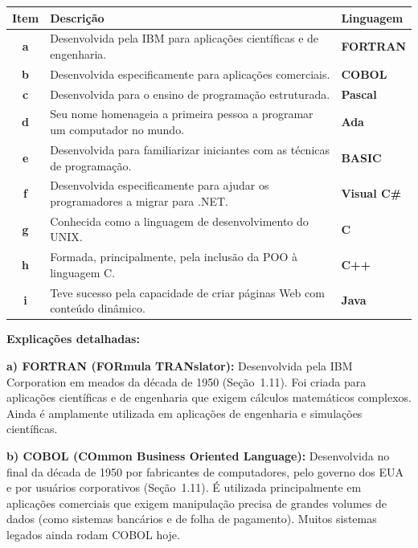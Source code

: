 \documentclass[12pt,a4paper]{article}
\begin{document}
\begin{respostabox}

\begin{center}
\renewcommand{\arraystretch}{1.6}
\begin{tabular}{>{\bfseries}c p{7.5cm} l}
  \toprule
  \textbf{Item} & \textbf{Descrição} & \textbf{Linguagem} \\
  \midrule
  a & Desenvolvida pela IBM para aplicações científicas e de engenharia. &
    \textcolor{deitelblue}{\bfseries FORTRAN} \\
  b & Desenvolvida especificamente para aplicações comerciais. &
    \textcolor{deitelblue}{\bfseries COBOL} \\
  c & Desenvolvida para o ensino de programação estruturada. &
    \textcolor{deitelblue}{\bfseries Pascal} \\
  d & Seu nome homenageia a primeira pessoa a programar um computador no mundo. &
    \textcolor{deitelblue}{\bfseries Ada} \\
  e & Desenvolvida para familiarizar iniciantes com as técnicas de programação. &
    \textcolor{deitelblue}{\bfseries BASIC} \\
  f & Desenvolvida especificamente para ajudar os programadores a migrar para .NET. &
    \textcolor{deitelblue}{\bfseries Visual C\#} \\
  g & Conhecida como a linguagem de desenvolvimento do UNIX. &
    \textcolor{deitelblue}{\bfseries C} \\
  h & Formada, principalmente, pela inclusão da POO à linguagem C. &
    \textcolor{deitelblue}{\bfseries C++} \\
  i & Teve sucesso pela capacidade de criar páginas Web com conteúdo dinâmico. &
    \textcolor{deitelblue}{\bfseries Java} \\
  \bottomrule
\end{tabular}
\end{center}

\bigskip
\textbf{Explicações detalhadas:}

\textbf{a) FORTRAN (FORmula TRANslator):}
Desenvolvida pela IBM Corporation em meados da década de 1950 (Seção~1.11). Foi
criada para aplicações científicas e de engenharia que exigem cálculos matemáticos
complexos. Ainda é amplamente utilizada em aplicações de engenharia e simulações
científicas.

\medskip
\textbf{b) COBOL (COmmon Business Oriented Language):}
Desenvolvida no final da década de 1950 por fabricantes de computadores, pelo
governo dos EUA e por usuários corporativos (Seção~1.11). É utilizada principalmente
em aplicações comerciais que exigem manipulação precisa de grandes volumes de dados
(como sistemas bancários e de folha de pagamento). Muitos sistemas legados ainda
rodam COBOL hoje.


\end{respostabox}
\end{document}
